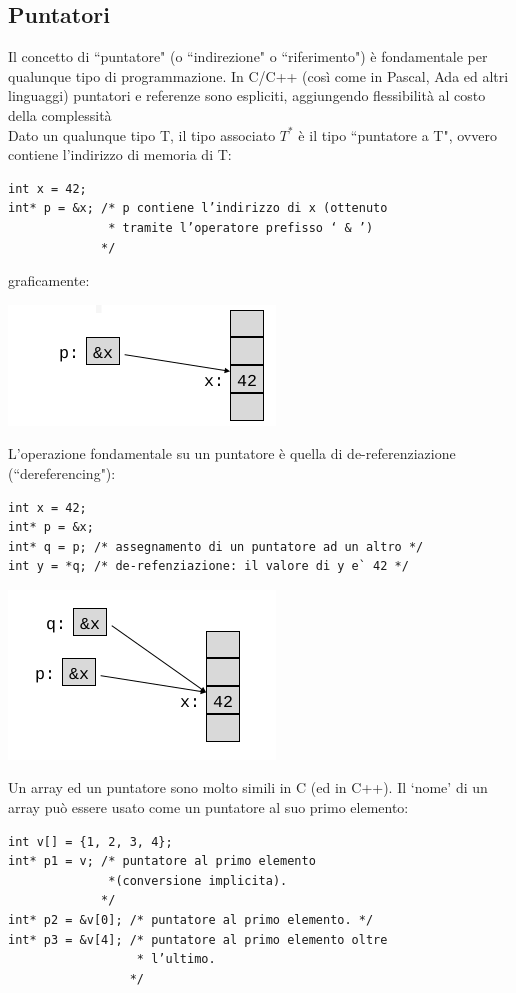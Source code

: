 \documentclass[a4paper,12pt, oneside]{book}
\begin{document}
\subsection{Puntatori}
Il concetto di “puntatore" (o “indirezione" o “riferimento") è fondamentale per qualunque tipo di programmazione. In C/C++ (così come in Pascal, Ada ed altri linguaggi) puntatori
e referenze sono espliciti, aggiungendo flessibilità al costo della complessità\\
Dato un qualunque tipo T, il tipo associato $T^*$ è il tipo “puntatore a T", ovvero contiene l'indirizzo di memoria di T:
\begin{verbatim}
int x = 42;
int* p = &x; /* p contiene l’indirizzo di x (ottenuto
              * tramite l’operatore prefisso ‘ & ’)
             */
\end{verbatim}
graficamente:
\begin{center}
\includegraphics[scale=3]{img/c.png}
\end{center}
L’operazione fondamentale su un puntatore è quella di
de-referenziazione (“dereferencing"):
\begin{verbatim}
int x = 42;
int* p = &x;
int* q = p; /* assegnamento di un puntatore ad un altro */
int y = *q; /* de-refenziazione: il valore di y e` 42 */
\end{verbatim}
\begin{center}
\includegraphics[scale=3]{img/c2.png}
\end{center}
\newpage
Un array ed un puntatore sono molto simili in C (ed in C++). Il ‘nome’ di un array può essere usato come un puntatore al suo primo elemento:
\begin{verbatim}
int v[] = {1, 2, 3, 4};
int* p1 = v; /* puntatore al primo elemento
              *(conversione implicita).
             */
int* p2 = &v[0]; /* puntatore al primo elemento. */
int* p3 = &v[4]; /* puntatore al primo elemento oltre
                  * l’ultimo.
                 */
\end{verbatim}
\end{document}
